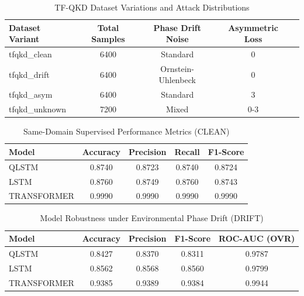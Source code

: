 \documentclass[10pt, journal, letterpaper, twocolumn]{IEEEtran}
\begin{document}
\begin{table}[htbp]
\centering
\caption{TF-QKD Dataset Variations and Attack Distributions}
\label{tab:dataset_params}
\begin{tabular}{@{}lcccc@{}}
\toprule
\textbf{Dataset Variant} & \textbf{Total Samples} & \textbf{Phase Drift Noise} & \textbf{Asymmetric Loss} \\ \midrule
tfqkd\_clean & 6400 & Standard & 0 \\
tfqkd\_drift & 6400 & Ornstein-Uhlenbeck & 0 \\
tfqkd\_asym & 6400 & Standard & 3 \\
tfqkd\_unknown & 7200 & Mixed & 0-3 \\
\bottomrule
\end{tabular}
\end{table}
\begin{table}[htbp]
\centering
\caption{Same-Domain Supervised Performance Metrics (CLEAN)}
\label{tab:clean_metrics}
\begin{tabular}{@{}lcccc@{}}
\toprule
\textbf{Model} & \textbf{Accuracy} & \textbf{Precision} & \textbf{Recall} & \textbf{F1-Score} \\ \midrule
QLSTM & 0.8740 & 0.8723 & 0.8740 & 0.8724 \\
LSTM & 0.8760 & 0.8749 & 0.8760 & 0.8743 \\
TRANSFORMER & 0.9990 & 0.9990 & 0.9990 & 0.9990 \\
\bottomrule
\end{tabular}
\end{table}
\begin{table}[htbp]
\centering
\caption{Model Robustness under Environmental Phase Drift (DRIFT)}
\label{tab:drift_metrics}
\begin{tabular}{@{}lcccc@{}}
\toprule
\textbf{Model} & \textbf{Accuracy} & \textbf{Precision} & \textbf{F1-Score} & \textbf{ROC-AUC (OVR)} \\ \midrule
QLSTM & 0.8427 & 0.8370 & 0.8311 & 0.9787 \\
LSTM & 0.8562 & 0.8568 & 0.8560 & 0.9799 \\
TRANSFORMER & 0.9385 & 0.9389 & 0.9384 & 0.9944 \\
\bottomrule
\end{tabular}
\end{table}
\end{document}
